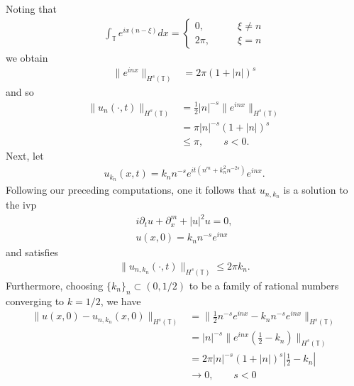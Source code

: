 \documentclass[12pt,reqno]{amsart}
\numberwithin{equation}{section}  %
\numberwithin{figure}{section}
\newcommand{\ci}{\mathbb{T}}
\newcommand{\p}{\partial}
\theoremstyle{plain}
\theoremstyle{definition}
\theoremstyle{remark}
\begin{document}
%
%
Noting that
%
\begin{equation*}
	\begin{split}
		\int_{\ci}e^{ix(n - \xi)}dx =
		\begin{cases}0, \qquad & \xi \neq n 
			\\
			2 \pi, \qquad & \xi = n 
		\end{cases}
	\end{split}
\end{equation*}
%
%
we obtain
%
%
\begin{equation}
	\label{oscill-bound}
	\begin{split}
		\|e^{inx}\|_{H^{s}(\ci)} & = 2 \pi (1 + | n |)^{s}
	\end{split}
\end{equation}
%
%
and so
%
%
\begin{equation*}
	\begin{split}
		\|u_{n}(\cdot, t)\|_{H^s{(\ci)}}
    & = \frac{1}{2}|n|^{-s}\|e^{inx}\|_{H^{s}(\ci)}
    \\
    & = \pi |n|^{-s} (1 + | n |)^{s} 
    \\
    & \le \pi, \qquad s < 0.
	\end{split}
\end{equation*}
%
%
Next, let
%
%
\begin{equation*}
	\begin{split}
		u_{k_{n}}(x,t) = k_{n}n^{-s}e^{it\left( n^{m} + k_{n}^2 n^{-2s}
		\right)}e^{inx}.
	\end{split}
\end{equation*}
%
%
Following our preceding computations, one it follows that $u_{n, k_{n}}$ is a solution to the ivp
%
%
\begin{equation}
	\label{family-ivp}
	\begin{split}
		i\p_t u + \p_x^{m} + | u |^{2}u = 0,
		\\
		u(x,0) = k_{n}n^{-s}e^{inx}
	\end{split}
\end{equation}
%
%
and satisfies 
%
%
\begin{equation*}
	\begin{split}
		\|u_{n, k_{n}}(\cdot, t)\|_{H^{s}(\ci)} \le 2 \pi k_{n}.
	\end{split}
\end{equation*}
%
%
Furthermore, choosing $\{k_{n}\}_{n} \subset (0, 1/2)$ to be a family of
rational numbers converging to $k =1/2$, we have
%
%
\begin{equation*}
	\begin{split}
		\|u(x,0) - u_{n, k_{n}}(x, 0) \|_{H^s(\ci)} 
		& =
		\|\frac{1}{2}n^{-s}e^{inx} - k_{n}n^{-s}e^{inx} \|_{H^s(\ci)}
		\\
		& = | n |^{-s} \|e^{inx}(\frac{1}{2} - k_{n})\|_{H^s(\ci)}
		\\
    & = 2 \pi |n|^{-s}(1+| n |)^{s} |\frac{1}{2} - k_{n}|
    \\
    & \to 0, \qquad s < 0
	\end{split}
\end{equation*}
\end{document}
